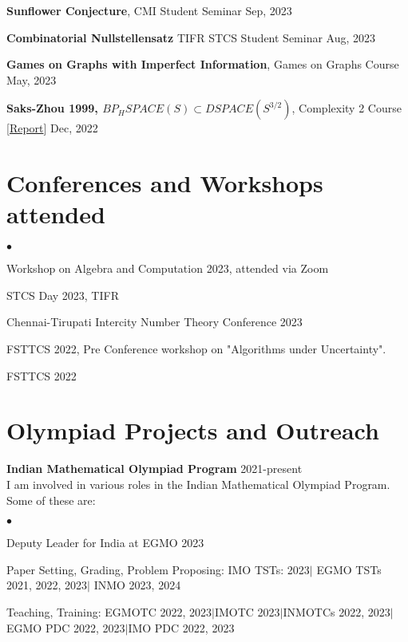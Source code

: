 \documentclass[margin,line, 10pt]{res}
\newenvironment{list2}{
  \begin{list}{$\bullet$}{%
      \setlength{\itemsep}{0in}
      \setlength{\parsep}{0in} \setlength{\parskip}{0in}
      \setlength{\topsep}{0in} \setlength{\partopsep}{0in} 
      \setlength{\leftmargin}{0.2in}}}{\end{list}}
\begin{document}
\begin{resume}
{\bf Sunflower Conjecture}, CMI Student Seminar \hfill Sep, 2023

\vspace*{-2.5mm}
{\bf Combinatorial Nullstellensatz} TIFR STCS Student Seminar \hfill Aug, 2023

\vspace*{-2.5mm}
{\bf Games on Graphs with Imperfect Information}, Games on Graphs Course \hfill May, 2023

\vspace*{-2.5mm}
{\bf Saks-Zhou 1999, $BP_HSPACE(S)\subset DSPACE(S^{3/2})$}, Complexity 2 Course \hspace{0.5em} [\href{https://www.dropbox.com/scl/fi/d3o6bhib7i7ifok6b8t79/Saks-and-Zhou-1999-Report-Aryan-Agarwala-and-Rohan-Goyal.pdf?rlkey=1xirwrhdz8541vuiq9l189apk&dl=0}{Report}] \hfill Dec, 2022 

\section{\sc Conferences and Workshops attended}

\begin{list2}
    \item Workshop on Algebra and Computation 2023, attended via Zoom
    \item STCS Day 2023, TIFR 
    \item Chennai-Tirupati Intercity Number Theory Conference 2023
    \item FSTTCS 2022, Pre Conference workshop on "Algorithms under Uncertainty".
    \item FSTTCS 2022
\end{list2}

\section{\sc Olympiad Projects and Outreach}
{\bf Indian Mathematical Olympiad Program} \hfill 2021-present\\
I am involved in various roles in the Indian Mathematical Olympiad Program. Some of these are:
\begin{list2}
    \item Deputy Leader for India at EGMO 2023
    \item Paper Setting, Grading, Problem Proposing: IMO TSTs: 2023$\mid$ EGMO TSTs 2021, 2022, 2023$\mid$  INMO 2023, 2024
    \item Teaching, Training: EGMOTC 2022, 2023$\mid$IMOTC 2023$\mid$INMOTCs 2022, 2023$\mid$EGMO PDC 2022, 2023$\mid$IMO PDC 2022, 2023
\end{list2}


\end{resume}
\end{document}
